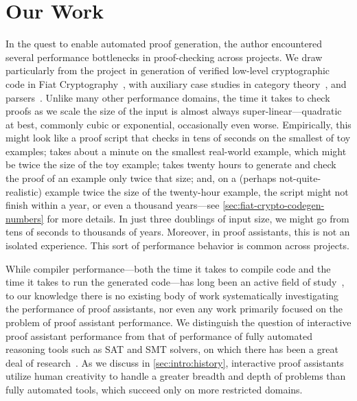 \section{Our Work}\label{sec:problem}

In the quest to enable automated proof generation, the author encountered several performance bottlenecks in proof-checking across projects. 
We draw particularly from the project in generation of verified low-level cryptographic code in Fiat Cryptography~\cite{FiatCryptoSP19}, with auxiliary case studies in category theory~\cite{category-coq-experience}, and parsers~\cite{jgross-masters-thesis}.
\label{sec:first-fiat-crypto}%
Unlike many other performance domains, the time it takes to check proofs as we scale the size of the input is almost always super-linear---quadratic at best, commonly cubic or exponential, occasionally even worse.
Empirically, this might look like a proof script that checks in tens of seconds on the smallest of toy examples; takes about a minute on the smallest real-world example, which might be twice the size of the toy example; takes twenty hours to generate and check the proof of an example only twice that size; and, on a (perhaps not-quite-realistic) example twice the size of the twenty-hour example, the script might not finish within a year, or even a thousand years---see \autoref{sec:fiat-crypto-codegen-numbers} for more details.
In just three doublings of input size, we might go from tens of seconds to thousands of years.
Moreover, in proof assistants, this is not an isolated experience.
This sort of performance behavior is common across projects.

While compiler performance---both the time it takes to compile code and the time it takes to run the generated code---has long been an active field of study~\cite{CC++Performance2017,georges2007statistically,mytkowicz-wrong-data}, to our knowledge there is no existing body of work systematically investigating the performance of proof assistants, nor even any work primarily focused on the problem of proof assistant performance.
We distinguish the question of interactive proof assistant performance from that of performance of fully automated reasoning tools such as SAT and SMT solvers, on which there has been a great deal of research~\cite{Efficiency1994Boulton}.
As we discuss in \autoref{sec:intro:history}, interactive proof assistants utilize human creativity to handle a greater breadth and depth of problems than fully automated tools, which succeed only on more restricted domains.

